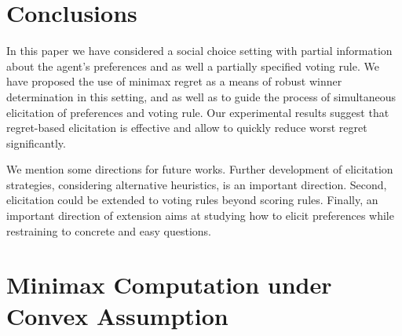 \section{Conclusions}  
\label{sec:conclusions}
In this paper we have considered a  social choice setting with partial  information about the agent's  
preferences and as well a partially specified voting rule.
We have proposed the use of minimax regret as a means of robust winner determination in this setting, and as well as to guide the process of simultaneous elicitation of preferences and voting rule.
Our experimental results %
suggest that regret-based elicitation is effective and allow to quickly reduce worst regret significantly.


We mention some directions for future works.
Further development of elicitation strategies, considering alternative heuristics, is an important direction. 
Second, elicitation could be extended to voting rules beyond scoring rules.
Finally, an important direction of extension aims at studying how to elicit preferences while restraining to concrete and easy questions.


% 


\appendix
\section{Minimax Computation under Convex Assumption} 

